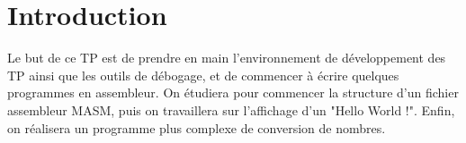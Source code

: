 \chapter{Introduction}

Le but de ce TP est de prendre en main l’environnement de développement des TP ainsi que les outils de débogage, et de commencer à écrire quelques programmes en assembleur.
On étudiera pour commencer la structure d'un fichier assembleur MASM, puis on travaillera sur l'affichage d'un "Hello World !". Enfin, on réalisera un programme plus complexe de conversion de nombres.